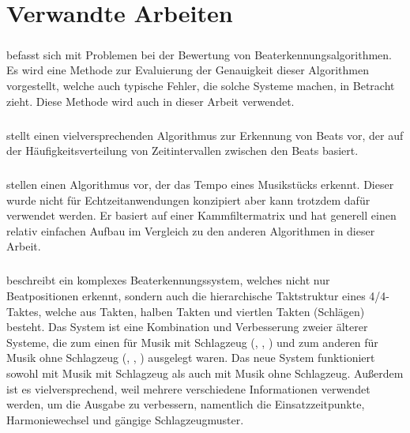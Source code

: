 \chapter{Verwandte Arbeiten}
\label{verwandte_arbeiten}
\acresetall

\paragraph{\cite{1997_GoMu1}}
{
	befasst sich mit Problemen bei der Bewertung von Beaterkennungsalgorithmen.
	Es wird eine Methode zur Evaluierung der Genauigkeit dieser Algorithmen vorgestellt,
		welche auch typische Fehler,
		die solche Systeme machen,
		in Betracht zieht.
	Diese Methode wird auch in dieser Arbeit verwendet.
}


\paragraph{\cite{2000_Di}}
{
	stellt einen vielversprechenden Algorithmus zur Erkennung von Beats vor,
		der auf der Häufigkeitsverteilung von Zeitintervallen zwischen den Beats basiert.
}

\paragraph{\cite{2001_BeatThis}}
{
	stellen einen Algorithmus vor,
		der das Tempo eines Musikstücks erkennt.
	Dieser wurde nicht für Echtzeitanwendungen konzipiert
		aber kann trotzdem dafür verwendet werden.
	Er basiert auf einer Kammfiltermatrix
		und hat generell einen relativ einfachen Aufbau im Vergleich zu den anderen Algorithmen in dieser Arbeit.
}

\paragraph{\cite{2001_Go}}
{
	beschreibt ein komplexes Beaterkennungssystem,
		welches nicht nur Beatpositionen erkennt,
		sondern auch die hierarchische Taktstruktur eines 4/4-Taktes,
		welche aus Takten, halben Takten und viertlen Takten (Schlägen) besteht.
	Das System ist eine Kombination und Verbesserung zweier älterer Systeme,
		die zum einen für Musik mit Schlagzeug (\cite{1994_GoMu}, \cite{1995_GoMu1}, \cite{1998_GoMu})
		und zum anderen für Musik ohne Schlagzeug (\cite{1996_GoMu}, \cite{1997_GoMu2}, \cite{1999_GoMu})
		ausgelegt waren.
	Das neue System funktioniert sowohl mit Musik mit Schlagzeug als auch mit Musik ohne Schlagzeug.
	Au{\ss}erdem ist es vielversprechend,
		weil mehrere verschiedene Informationen verwendet werden,
		um die Ausgabe zu verbessern,
		namentlich die Einsatzzeitpunkte, Harmoniewechsel und gängige Schlagzeugmuster.
}

